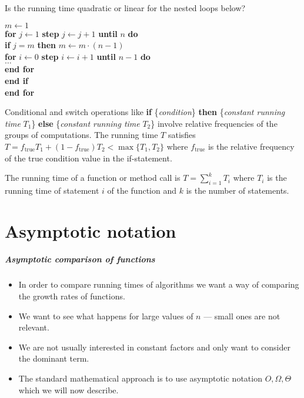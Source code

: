 \begin{Boxample}[6]
\label{exm:nest1}
Is the running time quadratic or linear for the nested loops below?\\

\begin{minipage}{5in}
\Algorbody
{
\(m \leftarrow 1\) \\
\textbf{for} \(j \leftarrow 1\) \textbf{step} \(j \leftarrow j+1\) 
                                    \textbf{until} \(n\) \textbf{do}\\
\>\textbf{if} \(j = m \) \textbf{then} \(m \leftarrow m \cdot (n-1)\) \\
\>\>\textbf{for} \(i \leftarrow  0\) \textbf{step} \(i \leftarrow i+1\) 
                                       \textbf{until} \(n-1\) \textbf{do}\\
\>\>\>$\ldots$  \\
\>\>\textbf{end for} \\
\>\textbf{end if}\\
\textbf{end for} \\
}
\end{minipage}

\end{Boxample}


Conditional and switch operations like \textbf{if}
\{\emph{condition}\} \textbf{then} \{\emph{constant running time}
$T_1$\} \textbf{else} \{\emph{constant running time} $T_2$\} involve
relative frequencies of the groups of computations.  The running time
$T$ satisfies $T = f_\mathrm{true} T_1 + (1 - f_\mathrm{true}) T_2 <
\max \{ T_1, T_2 \}$ where $f_\mathrm{true}$ is the relative frequency
of the true condition value in the if-statement.

The running time of a function or method call is $T = \sum_{i=1}^{k}T_i$
where $T_i$ is the running time of statement \(i\) of the function
and $k$ is the number of statements.


\chapter{Asymptotic notation} %

\paragraph{Asymptotic comparison of functions}
\begin{itemize}
\item In order to compare running times of algorithms we want a way of comparing
 the growth rates of functions. 
\item We want to see what happens for large values of $n$ --- small ones are not
 relevant.
\item We are not usually interested in constant factors and only want to consider the 
dominant term.
\item The standard mathematical approach is to use asymptotic notation 
$O, \Omega, \Theta$ which we will now describe.
\end{itemize}


